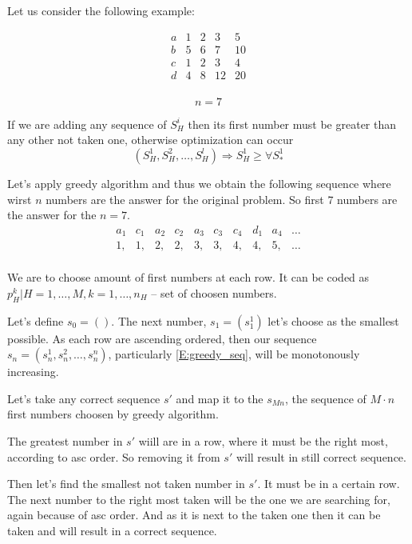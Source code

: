 \documentclass{amsart}
\begin{document}
Let us consider the following example:
\begin{multicols}{2}
\[
  \begin{matrix}
    a & 1 & 2 & 3 & 5 \\
    b & 5 & 6 & 7 & 10 \\
    c & 1 & 2 & 3 & 4 \\
    d & 4 & 8 & 12 & 20 \\
  \end{matrix}
\]

\hfill

\[
  n = 7
\]

If we are adding any sequence of $S_H^i$ then its first number
must be greater than any other not taken one, otherwise
optimization can occur
\[
  (S_H^1, S_H^2,\dots, S_H^l) \Rightarrow S_H^1 \geqslant \forall S_*^1
\]
\end{multicols}

Let's apply greedy algorithm and thus we obtain the following sequence
where wirst $n$ numbers are the answer for the original problem.
So first 7 numbers are the answer for the $n=7$.
\begin{equation}\label{E:greedy_seq}
  \begin{matrix}
    a_1 & c_1 & a_2 & c_2 & a_3 & c_3 & c_4 & d_1 & a_4 & \dots \\
    1,  & 1,  & 2,  & 2,  & 3,  & 3,  &4,  & 4,   & 5,  & \dots \\
  \end{matrix}
\end{equation}

We are to choose amount of first numbers at each row.
It can be coded as ${p_H^k | H = 1,\dots,M, k=1,\dots,n_H}$ -- set
of choosen numbers.

Let's define $s_0=()$. The next number, $s_1=(s_1^1)$
let's choose as the smallest possible.
As each row are ascending ordered, then our sequence
$s_n=(s_n^1, s_n^2, \dots, s_n^n)$, particularly \eqref{E:greedy_seq},
will be monotonously increasing.

Let's take any correct sequence $s'$ and map it to the $s_{Mn}$,
the sequence of $M \cdot n$ first numbers choosen by greedy algorithm.

The greatest number in $s'$ wiill are in a row, where it must be
the right most, according to asc order. So removing it from $s'$
will result in still correct sequence.

Then let's find the smallest not taken number in $s'$. It must be in
a certain row. The next number to the right most taken will be the
one we are searching for, again because of asc order. And as it is
next to the taken one then it can be taken and will result
in a correct sequence.
\end{document}
